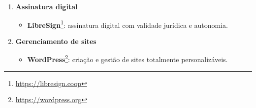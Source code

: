 \begin{enumerate}
    \item \textbf{Assinatura digital}
    \begin{itemize}
        \item \textbf{LibreSign}\footnote{\url{https://libresign.coop}}: assinatura digital com validade jurídica e autonomia.
    \end{itemize}

    \item \textbf{Gerenciamento de sites}
    \begin{itemize}
        \item \textbf{WordPress}\footnote{\url{https://wordpress.org}}: criação e gestão de sites totalmente personalizáveis.
    \end{itemize}
\end{enumerate}